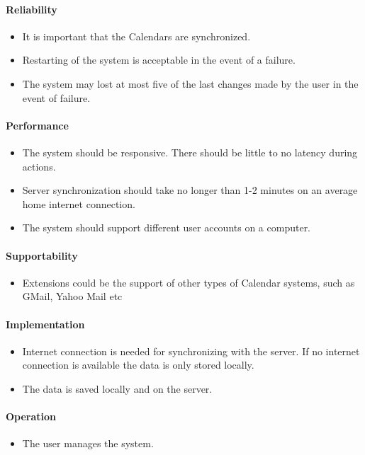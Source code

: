 \paragraph{Reliability}
\begin{itemize}
	\item It is important that the Calendars are synchronized.
	\item Restarting of the system is acceptable in the event of a failure.
	\item The system may lost at most five of the last changes made by the user in the event of failure.
\end{itemize}

\newpage
\paragraph{Performance}
\begin{itemize}
	\item The system should be responsive. There should be little to no latency during actions.
	\item Server synchronization should take no longer than 1-2 minutes on an average home internet connection.
	\item The system should support different user accounts on a computer.
\end{itemize}

\paragraph{Supportability}
\begin{itemize}
	\item Extensions could be the support of other types of Calendar systems, such as GMail, Yahoo Mail etc
\end{itemize}

\paragraph{Implementation}
\begin{itemize}
	\item Internet connection is needed for synchronizing with the server. If no internet connection is available the data is only stored locally.
	\item The data is saved locally and on the server.
\end{itemize}

\paragraph{Operation}
\begin{itemize}
	\item The user manages the system.
\end{itemize}

